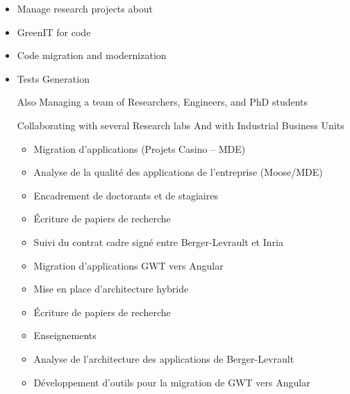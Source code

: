 \documentclass[10pt,a4paper,ragged2e,withhyper]{altacv}
\begin{document}
\begin{paracol}{2}



\begin{itemize}
\item Manage research projects about 
\item GreenIT for code
\item Code migration and modernization 
\item Tests Generation
\begin{itemize}

Also Managing a team of Researchers, Engineers, and PhD students

Collaborating with several Research labs And with Industrial Business Units

\divider

\begin{itemize}
  \item Migration d'applications (Projets Casino -- MDE)
  \item Analyse de la qualité des applications de l'entreprise (Moose/MDE)
  \item Encadrement de doctorants et de stagiaires
  \item Écriture de papiers de recherche
  \item Suivi du contrat cadre signé entre Berger-Levrault et Inria
\end{itemize}

\divider

\begin{itemize}
  \item Migration d'applications GWT vers Angular
  \item Mise en place d'architecture hybride
  \item Écriture de papiers de recherche
  \item Enseignements
\end{itemize}

\divider

\begin{itemize}
  \item Analyse de l’architecture des applications de Berger-Levrault
  \item Développement d'outils pour la migration de GWT vers Angular
\end{itemize}


\end{itemize}
\end{itemize}
\end{paracol}
\end{document}
